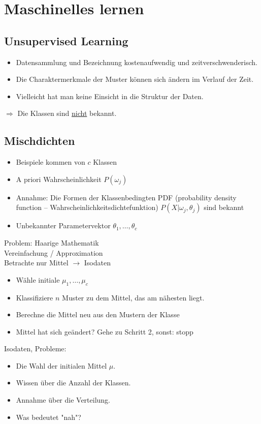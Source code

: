 
\section{Maschinelles lernen}

\subsection{Unsupervised Learning}

\begin{itemize}
\item Datensammlung und Bezeichnung kostenaufwendig und zeitverschwenderisch.
\item Die Charaktermerkmale der Muster können sich ändern im Verlauf der Zeit.
\item Vielleicht hat man keine Einsicht in die Struktur der Daten.
\end{itemize}
$\Rightarrow$ Die Klassen sind \underline{nicht} bekannt.

\subsection{Mischdichten}

\begin{itemize}
\item Beispiele kommen von $c$ Klassen
\item A priori Wahrscheinlichkeit $P(\omega_j)$
\item Annahme: Die Formen der Klassenbedingten PDF (probability density function -- Wahrscheinlichkeitsdichtefunktion) $P(X | \omega_j , \theta_j)$ sind bekannt
\item Unbekannter Parametervektor $\theta_1, \dots, \theta_c$
\end{itemize}
Problem: Haarige Mathematik \\ Vereinfachung / Approximation \\ Betrachte nur Mittel $\to$ Isodaten
\begin{itemize}
\item Wähle initiale $\mu_1, \dots, \mu_c$
\item Klassifiziere $n$ Muster zu dem Mittel, das am nähesten liegt.
\item Berechne die Mittel neu aus den Mustern der Klasse
\item Mittel hat sich geändert? Gehe zu Schritt 2, sonst: stopp
\end{itemize}
Isodaten, Probleme:
\begin{itemize}
\item Die Wahl der initialen Mittel $\mu$.
\item Wissen über die Anzahl der Klassen.
\item Annahme über die Verteilung.
\item Was bedeutet "{}nah"{}?
\end{itemize}

